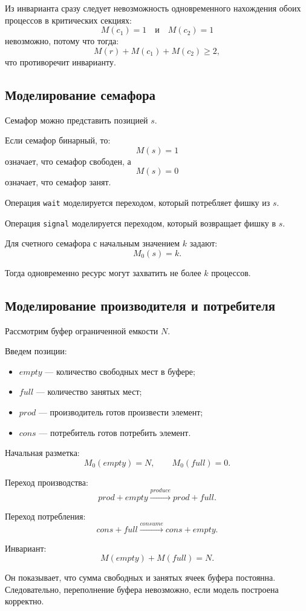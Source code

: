 \documentclass[12pt,a4paper]{article}
\begin{document}
Из инварианта сразу следует невозможность одновременного нахождения обоих процессов в критических секциях:
\[
M(c_1)=1
\quad \text{и} \quad
M(c_2)=1
\]
невозможно, потому что тогда:
\[
M(r)+M(c_1)+M(c_2)\ge 2,
\]
что противоречит инварианту.

\subsection{Моделирование семафора}

Семафор можно представить позицией $s$.

Если семафор бинарный, то:
\[
M(s)=1
\]
означает, что семафор свободен,
а
\[
M(s)=0
\]
означает, что семафор занят.

Операция \texttt{wait} моделируется переходом, который потребляет фишку из $s$.

Операция \texttt{signal} моделируется переходом, который возвращает фишку в $s$.

Для счетного семафора с начальным значением $k$ задают:
\[
M_0(s)=k.
\]

Тогда одновременно ресурс могут захватить не более $k$ процессов.

\subsection{Моделирование производителя и потребителя}

Рассмотрим буфер ограниченной емкости $N$.

Введем позиции:
\begin{itemize}
    \item $empty$ --- количество свободных мест в буфере;
    \item $full$ --- количество занятых мест;
    \item $prod$ --- производитель готов произвести элемент;
    \item $cons$ --- потребитель готов потребить элемент.
\end{itemize}

Начальная разметка:
\[
M_0(empty)=N,
\qquad
M_0(full)=0.
\]

Переход производства:
\[
prod + empty \xrightarrow{produce} prod + full.
\]

Переход потребления:
\[
cons + full \xrightarrow{consume} cons + empty.
\]

Инвариант:
\[
M(empty)+M(full)=N.
\]

Он показывает, что сумма свободных и занятых ячеек буфера постоянна. Следовательно, переполнение буфера невозможно, если модель построена корректно.
\end{document}
